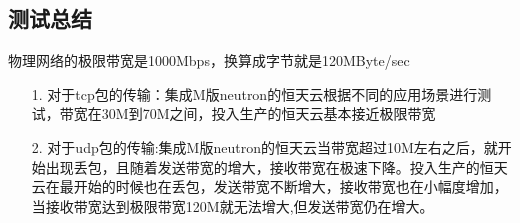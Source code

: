 \documentclass[a4paper,left=1.5cm,right=1.5cm,11pt]{article}
\begin{document}
\subsection{测试总结}
物理网络的极限带宽是1000Mbps，换算成字节就是120MByte/sec
\begin{itemize}
	\item[1.]对于tcp包的传输：集成M版neutron的恒天云根据不同的应用场景进行测试，带宽在30M到70M之间，投入生产的恒天云基本接近极限带宽
	\item[2.]对于udp包的传输:集成M版neutron的恒天云当带宽超过10M左右之后，就开始出现丢包，且随着发送带宽的增大，接收带宽在极速下降。投入生产的恒天云在最开始的时候也在丢包，发送带宽不断增大，接收带宽也在小幅度增加，当接收带宽达到极限带宽120M就无法增大,但发送带宽仍在增大。
\end{itemize}
\clearpage
\end{document}
